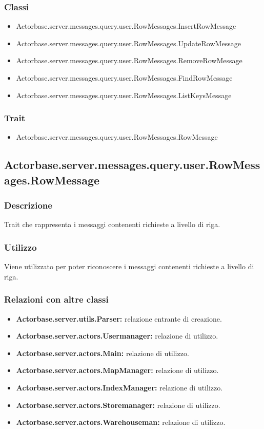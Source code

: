 \documentclass[a4paper]{article}
\begin{document}
			\subsubsection{Classi}
				\begin{itemize}
					\item Actorbase.server.messages.query.user.RowMessages.InsertRowMessage
					\item Actorbase.server.messages.query.user.RowMessages.UpdateRowMessage
					\item Actorbase.server.messages.query.user.RowMessages.RemoveRowMessage
					\item Actorbase.server.messages.query.user.RowMessages.FindRowMessage
					\item Actorbase.server.messages.query.user.RowMessages.ListKeysMessage
				\end{itemize}
				
			\subsubsection{Trait}
				\begin{itemize}
					\item Actorbase.server.messages.query.user.RowMessages.RowMessage
				\end{itemize}
		
		\subsection{Actorbase.server.messages.query.user.RowMessages.RowMessage}
			\subsubsection{Descrizione}
				Trait che rappresenta i messaggi contenenti richieste a livello di riga.
				
			\subsubsection{Utilizzo}
				Viene utilizzato per poter riconoscere i messaggi contenenti richieste a livello di riga.
			\subsubsection{Relazioni con altre classi}
				\begin{itemize}
					\item \textbf{Actorbase.server.utils.Parser:} relazione entrante di creazione.
					\item \textbf{Actorbase.server.actors.Usermanager:} relazione di utilizzo.
					\item \textbf{Actorbase.server.actors.Main:} relazione di utilizzo.
					\item \textbf{Actorbase.server.actors.MapManager:} relazione di utilizzo.
					\item \textbf{Actorbase.server.actors.IndexManager:} relazione di utilizzo.
					\item \textbf{Actorbase.server.actors.Storemanager:} relazione di utilizzo.
					\item \textbf{Actorbase.server.actors.Warehouseman:} relazione di utilizzo.
				\end{itemize}
\end{document}
